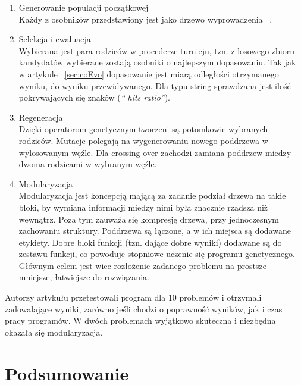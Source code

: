 \documentclass[twoside,a4paper,10]{book}
\begin{document}
\begin{enumerate}
\item Generowanie populacji początkowej \\
Każdy z osobników przedstawiony jest jako drzewo wyprowadzenia ~\citep{parsetree}.
\item Selekcja i ewaluacja \\
Wybierana jest para rodziców w procederze turnieju, tzn. z losowego zbioru kandydatów wybierane zostają osobniki o najlepszym dopasowaniu. Tak jak w artykule ~\ref{sec:coEvo} dopasowanie jest miarą odległości otrzymanego wyniku, do wyniku przewidywanego. Dla typu string sprawdzana jest ilość pokrywających się znaków (\textit{\enquote{ hits ratio}}).
\item Regeneracja\\
Dzięki operatorom genetycznym tworzeni są potomkowie wybranych rodziców. Mutacje polegają na wygenerowaniu nowego poddrzewa w wylosowanym węźle. Dla crossing-over zachodzi zamiana poddrzew miedzy dwoma rodzicami w wybranym węźle. 
\item Modularyzacja \\
Modularyzacja jest koncepcją mającą za zadanie podział drzewa na takie bloki, by wymiana informacji miedzy nimi była znacznie rzadsza niż wewnątrz. Poza tym zauważa się kompresję drzewa, przy jednoczesnym zachowaniu struktury. Poddrzewa są łączone, a w ich miejsca są dodawane etykiety. Dobre bloki funkcji (tzn. dające dobre wyniki) dodawane są do zestawu funkcji, co powoduje stopniowe uczenie się programu genetycznego. Głównym celem jest wiec rozłożenie zadanego problemu na prostsze - mniejsze, łatwiejsze do rozwiązania. 
\end{enumerate}
Autorzy artykułu przetestowali program dla 10 problemów i otrzymali zadowalające wyniki, zarówno jeśli chodzi o poprawność wyników, jak i czas pracy programów.  W dwóch problemach wyjątkowo skuteczna i niezbędna okazała się modularyzacja. 
\section{Podsumowanie}
   
\end{document}
